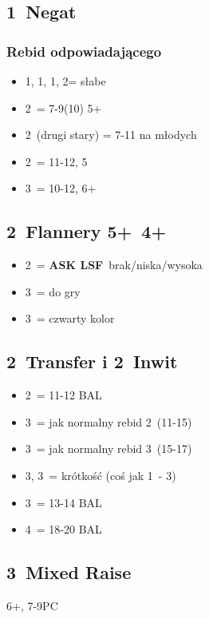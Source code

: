 \documentclass[12pt, a4paper]{article}
\newcommand{\lsf}{\color{WildStrawberry}\textbf{ASK LSF}\color{black}}
\newcommand*\link[1]{\hspace*{0em plus 1fill}\makebox{#1}}
\newcommand{\imp}{\color{BurntOrange}\link{\textbf{\large!}}\color{black}}
\newcommand{\exq}{\color{JungleGreen}\link{\textbf{\large{?!}}}\color{black}}
\begin{document}
\subsection*{1\diams\ Negat}
\subsubsection*{Rebid odpowiadającego}
\begin{itemize}
    \item 1\hearts, 1\spades, 1\nt, 2\clubs = słabe
    \item 2\diams\ = 7-9(10) 5+\diams
    \item 2\major\ (drugi stary) = 7-11 na młodych
    \item 2\nt\ = 11-12, 5\diams
    \item 3\diams\ = 10-12, 6+\diams
\end{itemize}

\subsection*{2\hearts\ Flannery 5+\spades\ 4+\hearts}
\begin{itemize}
    \item 2\nt\ = \lsf\ brak/niska/wysoka \exq
    \item 3\clubs\ = do gry
    \item 3\diams\ = czwarty kolor \gf
\end{itemize}

\subsection*{2\spades\ Transfer i 2\ntx\ Inwit}
\begin{itemize}
    \item 2\nt\ = 11-12 BAL
    \item 3\clubs\ = jak normalny rebid 2\clubs\ (11-15)
    \item 3\diams\ = jak normalny rebid 3\clubs\ (15-17) \imp
    \item 3\hearts, 3\spades\ = krótkość (coś jak 1\nt\ - 3\hearts)
    \item 3\nt\ = 13-14 BAL
    \item 4\nt\ = 18-20 BAL
\end{itemize}

\subsection*{3\clubs\ Mixed Raise}
6+\clubs, 7-9PC
\end{document}
